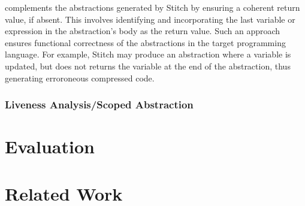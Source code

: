 \toolname complements the abstractions generated by Stitch by ensuring a coherent return value, if absent. This involves identifying and incorporating the last variable or expression in the abstraction’s body as the return value. Such an approach ensures functional correctness of the abstractions in the target programming language. For example, Stitch may produce an abstraction where a variable is updated, but does not returns the variable at the end of the abstraction, thus generating erroroneous compressed code. 

\subsubsection{Liveness Analysis/Scoped Abstraction}




\section{Evaluation}

\section{Related Work}

